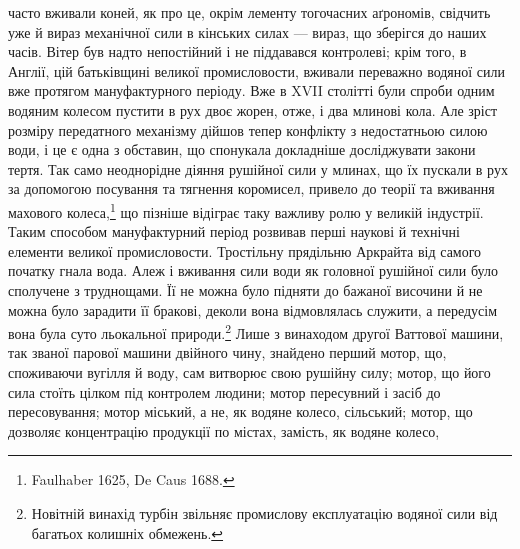 \parcont{}  %
часто вживали коней, як про це, окрім лементу тогочасних аґрономів,
свідчить уже й вираз механічної сили в кінських силах —
вираз, що зберігся до наших часів. Вітер був надто непостійний
і не піддавався контролеві; крім того, в Англії, цій батьківщині
великої промисловости, вживали переважно водяної сили вже
протягом мануфактурного періоду. Вже в XVII столітті були
спроби одним водяним колесом пустити в рух двоє жорен, отже, і
два млинові кола. Але зріст розміру передатного механізму дійшов
тепер конфлікту з недостатньою силою води, і це є одна з обставин,
що спонукала докладніше досліджувати закони тертя. Так
само неоднорідне діяння рушійної сили у млинах, що їх пускали
в рух за допомогою посування та тягнення коромисел, привело
до теорії та вживання махового колеса,\footnote{
Faulhaber 1625, De Caus 1688.
} що пізніше відіграє
таку важливу ролю у великій індустрії. Таким способом мануфактурний
період розвивав перші наукові й технічні елементи
великої промисловости. Тростільну прядільню Аркрайта від
самого початку гнала вода. Алеж і вживання сили води як
головної рушійної сили було сполучене з труднощами. Її не можна
було підняти до бажаної височини й не можна було зарадити її
бракові, деколи вона відмовлялась служити, а передусім вона
була суто льокальної природи.\footnote{
Новітній винахід турбін звільняє промислову експлуатацію
водяної сили від багатьох колишніх обмежень.
} Лише з винаходом другої Ваттової
машини, так званої парової машини двійного чину, знайдено
перший мотор, що, споживаючи вугілля й воду, сам витворює
свою рушійну силу; мотор, що його сила стоїть цілком під контролем
людини; мотор пересувний і засіб до пересовування; мотор
міський, а не, як водяне колесо, сільський; мотор, що дозволяє
концентрацію продукції по містах, замість, як водяне колесо,
